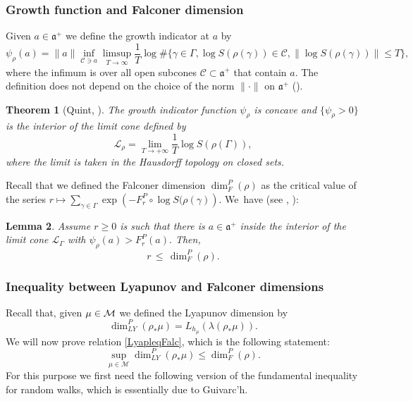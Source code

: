 \documentclass[10pt,a4paper]{amsart}
\newtheorem{theorem}{Theorem}[section]
\newtheorem{lemma}[theorem]{Lemma}
\newcommand{\CC}{\mathcal C}
\let\G\Gamma
\let\g\gamma
\newcommand{\aaa}{\mathfrak a}
\begin{document}
\subsubsection{Growth function and Falconer dimension}

Given \(a \in \aaa^+\) we define the growth indicator at \(a\) by
\begin{equation}\label{growth}
\psi_\rho(a) = \| a\| \inf_{\CC \ni a}
\limsup_{T \to \infty } \frac{1}{T}\log \# \{ \g \in \G, \log S(\rho(\g)) \in \CC, \|\log S(\rho(\g)) \| \leq T\}, \end{equation}
where the infimum is over all open subcones \(\CC \subset \aaa^+\) that contain \(a\). The definition does not depend on the choice of the norm \(\|{\cdot}\| \) on \(\aaa^+\) (\cite{Qui02a}).

\begin{theorem}[Quint, \cite{Qui02a}]\label{cone}
The growth indicator function \(\psi_\rho\) is concave and \(\lbrace \psi_\rho > 0\rbrace\) is the interior of the limit cone defined by
\[
\mathcal{L}_\rho = \lim_{T \to +\infty}\frac{1}{T}\log S(\rho(\Gamma)),
\]
where the limit is taken in the Hausdorff topology on closed sets.
\end{theorem}

Recall that we defined the Falconer dimension \(\dim_F^P(\rho)\) as the critical value of the series
\(r \mapsto \sum_{\gamma \in \Gamma}\exp\left(-F^P_r\circ \log S(\rho(\gamma)\right)\). We~have (see \cite[Lem.\,4.2]{sambarino}, \cite[Lem.\,III.1.3]{Qui02a}):

\begin{lemma}\label{falconer2}
Assume \(r\ge 0 \) is such that there is \(a \in \aaa^+ \) inside the interior of the limit cone \(\mathcal{L}_\Gamma \) with \(\psi_\rho (a) > F^P_r (a). \) Then,
\[
 r \, \le \, \dim_F^P (\rho).
\]
\end{lemma}

\subsubsection{Inequality between Lyapunov and Falconer dimensions\label{proofLyap}}

Recall that, given \(\mu \in\nobreak \mathcal{M}\) we defined the Lyapunov dimension by
\[
\dim_{LY}^P(\rho_\ast \mu) = L_{h_\mu}(\lambda(\rho_*\mu)).
\]
We will now prove relation \eqref{LyapleqFalc}, which is the following statement:
\[
\sup_{\mu \in \mathcal{M}}\dim_{LY}^P(\rho_\ast \mu) \le \dim_F^P(\rho).
\]
For this purpose we first need the following version of the fundamental inequality for random walks, which is essentially due to Guivarc'h.
\end{document}
